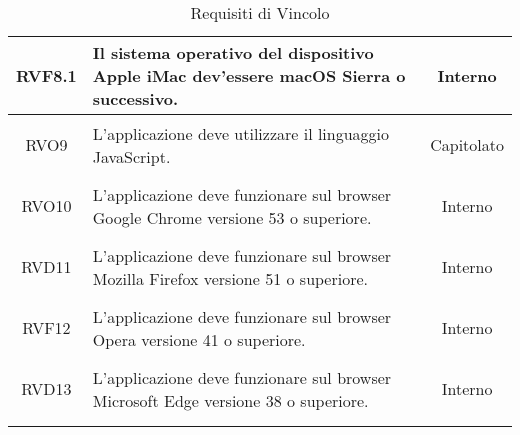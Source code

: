 \begin{longtable}{|c|>{\centering}m{7cm}|c|}
	\hypertarget{RVF8.1}{RVF8.1} & Il sistema operativo del dispositivo Apple iMac dev'essere macOS Sierra o successivo. & Interno\\ \hline
	\hypertarget{RVO9}{RVO9} & L'applicazione deve utilizzare il linguaggio JavaScript. & Capitolato\\ \hline
	\hypertarget{RVO10}{RVO10} & L'applicazione deve funzionare sul browser Google Chrome versione 53 o superiore. & Interno\\ \hline
	\hypertarget{RVD11}{RVD11} & L'applicazione deve funzionare sul browser Mozilla Firefox versione 51 o superiore. & Interno\\ \hline
	\hypertarget{RVF12}{RVF12} & L'applicazione deve funzionare sul browser Opera versione 41 o superiore. & Interno\\ \hline
	\hypertarget{RVD13}{RVD13} & L'applicazione deve funzionare sul browser Microsoft Edge versione 38 o superiore. & Interno\\ \hline
	
	\caption[Requisiti di Vincolo]{Requisiti di Vincolo}
	\label{tabella:req3}
\end{longtable}
\clearpage
